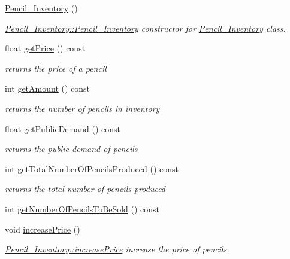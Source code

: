 \begin{DoxyCompactItemize}
\item 
\hyperlink{classPencil__Inventory_a68480c5a7aa85cee3cb19619115ad552}{Pencil\+\_\+\+Inventory} ()
\begin{DoxyCompactList}\small\item\em \hyperlink{classPencil__Inventory_a68480c5a7aa85cee3cb19619115ad552}{Pencil\+\_\+\+Inventory\+::\+Pencil\+\_\+\+Inventory} constructor for \hyperlink{classPencil__Inventory}{Pencil\+\_\+\+Inventory} class. \end{DoxyCompactList}\item 
float \hyperlink{classPencil__Inventory_a0ce9e6370396e24ae4d11b27b84c7160}{get\+Price} () const
\begin{DoxyCompactList}\small\item\em returns the price of a pencil \end{DoxyCompactList}\item 
int \hyperlink{classPencil__Inventory_a493a0967a8369d5b8c3e3709eeb21b5e}{get\+Amount} () const
\begin{DoxyCompactList}\small\item\em returns the number of pencils in inventory \end{DoxyCompactList}\item 
float \hyperlink{classPencil__Inventory_ac9bab24db01e4515abe06a3c5ec48fcf}{get\+Public\+Demand} () const
\begin{DoxyCompactList}\small\item\em returns the public demand of pencils \end{DoxyCompactList}\item 
int \hyperlink{classPencil__Inventory_ad7efa852dea32675f689e36c0ddfd7a7}{get\+Total\+Number\+Of\+Pencils\+Produced} () const
\begin{DoxyCompactList}\small\item\em returns the total number of pencils produced \end{DoxyCompactList}\item 
int \hyperlink{classPencil__Inventory_a3cd52fbcbd4e3bedbcbe2031cb9a3286}{get\+Number\+Of\+Pencils\+To\+Be\+Sold} () const
\item 
void \hyperlink{classPencil__Inventory_a7c9e758743530d09b95cd691181d078f}{increase\+Price} ()
\begin{DoxyCompactList}\small\item\em \hyperlink{classPencil__Inventory_a7c9e758743530d09b95cd691181d078f}{Pencil\+\_\+\+Inventory\+::increase\+Price} increase the price of pencils. \end{DoxyCompactList}\item 

\end{DoxyCompactItemize}
